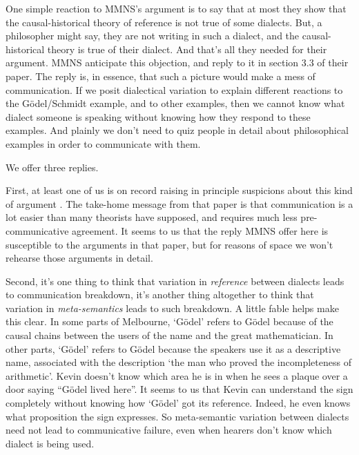 One simple reaction to MMNS's argument is to say that at most they show that the causal-historical theory of reference is not true of some dialects. But, a philosopher might say, they are not writing in such a dialect, and the causal-historical theory is true of their dialect. And that's all they needed for their argument. MMNS anticipate this objection, and reply to it in section 3.3 of their paper. The reply is, in essence, that such a picture would make a mess of communication. If we posit dialectical variation to explain different reactions to the G\"{o}del\-/\-Schmidt example, and to other examples, then we cannot know what dialect someone is speaking without knowing how they respond to these examples. And plainly we don't need to quiz people in detail about philosophical examples in order to communicate with them.

We offer three replies.

First, at least one of us is on record raising in principle suspicions about this kind of argument \citet{Maitra2007}. The take-home message from that paper is that communication is a lot easier than many theorists have supposed, and requires much less pre-communicative agreement. It seems to us that the reply MMNS offer here is susceptible to the arguments in that paper, but for reasons of space we won't rehearse those arguments in detail.

Second, it's one thing to think that variation in \textit{reference} between dialects leads to communication breakdown, it's another thing altogether to think that variation in \textit{meta-semantics} leads to such breakdown. A little fable helps make this clear. In some parts of Melbourne, `G\"{o}del' refers to G\"{o}del because of the causal chains between the users of the name and the great mathematician. In other parts, `G\"{o}del' refers to G\"{o}del because the speakers use it as a descriptive name, associated with the description `the man who proved the incompleteness of arithmetic'. Kevin doesn't know which area he is in when he sees a plaque over a door saying ``G\"{o}del lived here''. It seems to us that Kevin can understand the sign completely without knowing how `G\"{o}del' got its reference. Indeed, he even knows what proposition the sign expresses. So meta-semantic variation between dialects need not lead to communicative failure, even when hearers don't know which dialect is being used.


